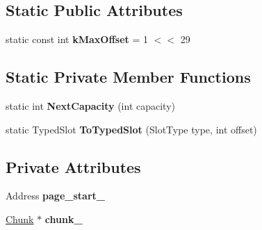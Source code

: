 \subsection*{Static Public Attributes}
\begin{DoxyCompactItemize}
\item 
static const int {\bfseries k\+Max\+Offset} = 1 $<$$<$ 29\hypertarget{classv8_1_1internal_1_1_typed_slot_set_a9c4e659908ea54d51dea1a0e1fb70b27}{}\label{classv8_1_1internal_1_1_typed_slot_set_a9c4e659908ea54d51dea1a0e1fb70b27}

\end{DoxyCompactItemize}
\subsection*{Static Private Member Functions}
\begin{DoxyCompactItemize}
\item 
static int {\bfseries Next\+Capacity} (int capacity)\hypertarget{classv8_1_1internal_1_1_typed_slot_set_adb124e913378147de0d91e3ba941917f}{}\label{classv8_1_1internal_1_1_typed_slot_set_adb124e913378147de0d91e3ba941917f}

\item 
static Typed\+Slot {\bfseries To\+Typed\+Slot} (Slot\+Type type, int offset)\hypertarget{classv8_1_1internal_1_1_typed_slot_set_a19c296b01bc31b10ad3fbffba69d44c0}{}\label{classv8_1_1internal_1_1_typed_slot_set_a19c296b01bc31b10ad3fbffba69d44c0}

\end{DoxyCompactItemize}
\subsection*{Private Attributes}
\begin{DoxyCompactItemize}
\item 
Address {\bfseries page\+\_\+start\+\_\+}\hypertarget{classv8_1_1internal_1_1_typed_slot_set_a3c84bc80ce33db390896b24122286e3e}{}\label{classv8_1_1internal_1_1_typed_slot_set_a3c84bc80ce33db390896b24122286e3e}

\item 
\hyperlink{structv8_1_1internal_1_1_typed_slot_set_1_1_chunk}{Chunk} $\ast$ {\bfseries chunk\+\_\+}\hypertarget{classv8_1_1internal_1_1_typed_slot_set_a2ebb1474409b33ac91afc2388d52eb67}{}\label{classv8_1_1internal_1_1_typed_slot_set_a2ebb1474409b33ac91afc2388d52eb67}

\end{DoxyCompactItemize}
